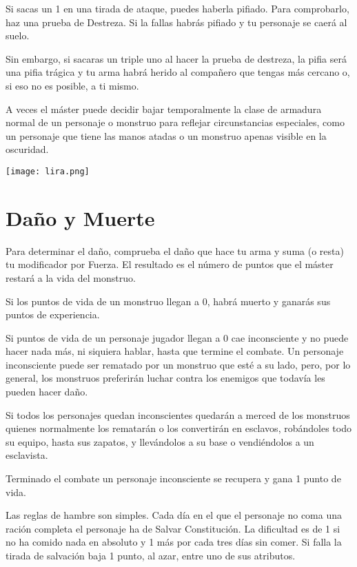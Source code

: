 \begin{multicols}{2}
\begin{table*}[p]
\end{table*}


Si sacas un 1 en una tirada de ataque, puedes haberla pifiado. Para comprobarlo,
haz una prueba de Destreza. Si la fallas habrás pifiado y tu personaje se caerá
al suelo.

Sin embargo, si sacaras un triple uno al hacer la prueba de destreza, la pifia
será una pifia trágica y tu arma habrá herido al compañero que tengas más cercano
o, si eso no es posible, a ti mismo.


A veces el máster puede decidir bajar temporalmente la clase de armadura normal
de un personaje o monstruo para reflejar circunstancias especiales, como un
personaje que tiene las manos atadas o un monstruo apenas visible en la
oscuridad.

\texttt{[image: lira.png]}

\section{Daño y Muerte}

Para determinar el daño, comprueba el daño que hace tu arma y suma (o resta) tu
modificador por Fuerza. El resultado es el número de puntos que el máster
restará a la vida del monstruo.

Si los puntos de vida de un monstruo llegan a 0, habrá muerto y ganarás sus puntos de
experiencia.

Si puntos de vida de un personaje jugador llegan a 0 cae inconsciente y no puede
hacer nada más, ni siquiera hablar, hasta que termine el combate. Un personaje
inconsciente puede ser rematado por un monstruo que esté a su lado, pero, por lo
general, los monstruos preferirán luchar contra los enemigos que todavía les
pueden hacer daño.

Si todos los personajes quedan inconscientes quedarán a merced de los monstruos
quienes normalmente los rematarán o los convertirán en esclavos, robándoles todo
su equipo, hasta sus zapatos, y llevándolos a su base o vendiéndolos a un esclavista.

Terminado el combate un personaje inconsciente se recupera y gana 1 punto de
vida.


Las reglas de hambre son simples. Cada día en el que el personaje no coma una
ración completa el personaje ha de Salvar Constitución. La dificultad es de 1
si no ha comido nada en absoluto y 1 más por cada tres días sin comer. Si falla
la tirada de salvación baja 1 punto, al azar, entre uno de sus atributos.


\end{multicols}
